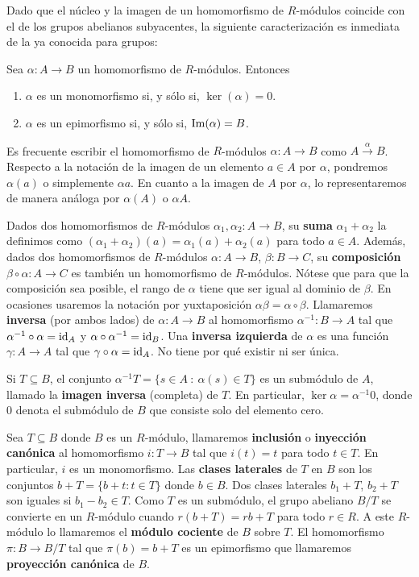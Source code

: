 Dado que el núcleo y la imagen de un homomorfismo de $R$-módulos coincide con el de los grupos abelianos subyacentes, la siguiente caracterización es inmediata de la ya conocida para grupos:

\begin{proposicion}
	Sea $\alpha: A \to B$ un homomorfismo de $R$-módulos. Entonces
	\begin{enumerate}
		\item $\alpha$ es un monomorfismo si, y sólo si, $\ker(\alpha) = 0$.
		\item $\alpha$ es un epimorfismo si, y sólo si, $\operatorname{Im}(\alpha) = B$.
	\end{enumerate}
\end{proposicion}

Es frecuente escribir el homomorfismo de $R$-módulos $\alpha: A \rightarrow B$ como $A \xrightarrow{\alpha} B$. Respecto a la notación de la imagen de un elemento $a \in A$ por $\alpha$, pondremos $\alpha(a)$ o simplemente $\alpha a$. En cuanto a la imagen de $A$ por $\alpha$, lo representaremos de manera análoga por $\alpha(A)$ o $\alpha A$.

Dados dos homomorfismos de $R$-módulos $\alpha_1, \alpha_2 : A \rightarrow B$, su \textbf{suma} $\alpha_1 + \alpha_2$ la definimos como $(\alpha_1 + \alpha_2)(a) = \alpha_1(a) + \alpha_2(a)$ para todo $a \in A$. Además, dados dos homomorfismos de $R$-módulos $\alpha: A \rightarrow B$, $\beta: B \rightarrow C$, su \textbf{composición} $\beta \circ \alpha: A \rightarrow C$ es también un homomorfismo de $R$-módulos. Nótese que para que la composición sea posible, el rango de $\alpha$ tiene que ser igual al dominio de $\beta$. En ocasiones usaremos la notación por yuxtaposición $\alpha\beta = \alpha \circ \beta$. Llamaremos \textbf{inversa} (por ambos lados) de $\alpha : A \rightarrow B$ al homomorfismo $\alpha^{-1} : B \rightarrow A$ tal que $\alpha^{-1} \circ \alpha = \operatorname{id}_A$ y $\alpha \circ \alpha^{-1} = \operatorname{id}_B$. Una \textbf{inversa izquierda} de $\alpha$ es una función $\gamma: A \rightarrow A$ tal que $\gamma \circ \alpha = \operatorname{id}_A$. No tiene por qué existir ni ser única.

Si \(T \subseteq B\), el conjunto \(\alpha^{-1}T = \{ s \in A \ : \ \alpha(s) \in T \} \) es un submódulo de \(A\), llamado la \textbf{imagen inversa} (completa) de \(T\). En particular, \(\ker \alpha = \alpha^{-1}0\), donde \(0\) denota el submódulo de \(B\) que consiste solo del elemento cero.

Sea \(T \subseteq B\) donde $B$ es un $R$-módulo, llamaremos \textbf{inclusión} o \textbf{inyección canónica} al homomorfismo $i: T \rightarrow B$ tal que $i(t) = t$ para todo $t \in T$. En particular, $i$ es un monomorfismo. Las \textbf{clases laterales} de $T$ en $B$ son los conjuntos $b + T = \{b + t : t \in T\}$ donde $b \in B$. Dos clases laterales $b_1 + T$, $b_2 + T$ son iguales si $b_1 - b_2 \in T$. Como $T$ es un submódulo, el grupo abeliano $B/T$ se convierte en un $R$-módulo cuando $r(b+T) = rb + T$ para todo $r \in R$. A este $R$-módulo lo llamaremos el \textbf{módulo cociente} de $B$ sobre $T$. El homomorfismo $\pi: B \rightarrow B/T$ tal que $\pi(b) = b + T$ es un epimorfismo que llamaremos \textbf{proyección canónica} de $B$.

